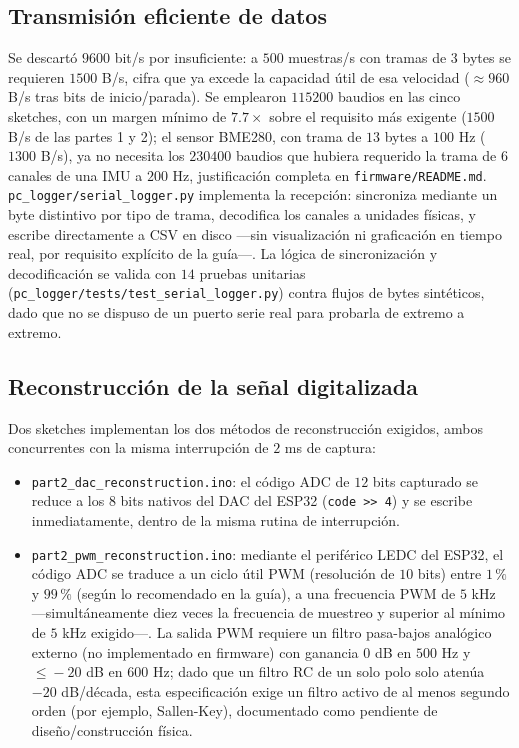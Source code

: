 \subsection{Transmisión eficiente de datos}

Se descartó $9600$ bit/s por insuficiente: a $500$ muestras/s con tramas de $3$ bytes se requieren $1500$ B/s, cifra que ya excede la capacidad útil de esa velocidad ($\approx 960$ B/s tras bits de inicio/parada). Se emplearon $115200$ baudios en las cinco sketches, con un margen mínimo de $7.7\times$ sobre el requisito más exigente ($1500$ B/s de las partes 1 y 2); el sensor BME280, con trama de $13$ bytes a $100$ Hz ($1300$ B/s), ya no necesita los $230400$ baudios que hubiera requerido la trama de $6$ canales de una IMU a $200$ Hz, justificación completa en \texttt{firmware/README.md}. \texttt{pc\_logger/serial\_logger.py} implementa la recepción: sincroniza mediante un byte distintivo por tipo de trama, decodifica los canales a unidades físicas, y escribe directamente a CSV en disco —sin visualización ni graficación en tiempo real, por requisito explícito de la guía—. La lógica de sincronización y decodificación se valida con $14$ pruebas unitarias (\texttt{pc\_logger/tests/test\_serial\_logger.py}) contra flujos de bytes sintéticos, dado que no se dispuso de un puerto serie real para probarla de extremo a extremo.

\subsection{Reconstrucción de la señal digitalizada}

Dos sketches implementan los dos métodos de reconstrucción exigidos, ambos concurrentes con la misma interrupción de $2$ ms de captura:

\begin{itemize}
\item \texttt{part2\_dac\_reconstruction.ino}: el código ADC de $12$ bits capturado se reduce a los $8$ bits nativos del DAC del ESP32 (\texttt{code >> 4}) y se escribe inmediatamente, dentro de la misma rutina de interrupción.
\item \texttt{part2\_pwm\_reconstruction.ino}: mediante el periférico LEDC del ESP32, el código ADC se traduce a un ciclo útil PWM (resolución de $10$ bits) entre $1\,\%$ y $99\,\%$ (según lo recomendado en la guía), a una frecuencia PWM de $5$ kHz —simultáneamente diez veces la frecuencia de muestreo y superior al mínimo de $5$ kHz exigido—. La salida PWM requiere un filtro pasa-bajos analógico externo (no implementado en firmware) con ganancia $0$ dB en $500$ Hz y $\leq\!-20$ dB en $600$ Hz; dado que un filtro RC de un solo polo solo atenúa $-20$ dB/década, esta especificación exige un filtro activo de al menos segundo orden (por ejemplo, Sallen-Key), documentado como pendiente de diseño/construcción física.
\end{itemize}

